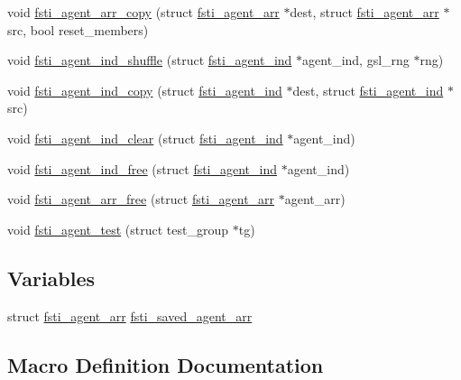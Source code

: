 \begin{DoxyCompactItemize}
\item 
void \mbox{\hyperlink{fsti-agent_8h_ae9ffb7f208aa2ca7f0e5a1999ae69425}{fsti\+\_\+agent\+\_\+arr\+\_\+copy}} (struct \mbox{\hyperlink{structfsti__agent__arr}{fsti\+\_\+agent\+\_\+arr}} $\ast$dest, struct \mbox{\hyperlink{structfsti__agent__arr}{fsti\+\_\+agent\+\_\+arr}} $\ast$src, bool reset\+\_\+members)
\item 
void \mbox{\hyperlink{fsti-agent_8h_ae598f299bc63165f2f0b5c9d5c72e52c}{fsti\+\_\+agent\+\_\+ind\+\_\+shuffle}} (struct \mbox{\hyperlink{structfsti__agent__ind}{fsti\+\_\+agent\+\_\+ind}} $\ast$agent\+\_\+ind, gsl\+\_\+rng $\ast$rng)
\item 
void \mbox{\hyperlink{fsti-agent_8h_a6681f5dfe9ce93defe0d395774010080}{fsti\+\_\+agent\+\_\+ind\+\_\+copy}} (struct \mbox{\hyperlink{structfsti__agent__ind}{fsti\+\_\+agent\+\_\+ind}} $\ast$dest, struct \mbox{\hyperlink{structfsti__agent__ind}{fsti\+\_\+agent\+\_\+ind}} $\ast$src)
\item 
void \mbox{\hyperlink{fsti-agent_8h_a6ea0014798a460e51b30b2d8af0dda25}{fsti\+\_\+agent\+\_\+ind\+\_\+clear}} (struct \mbox{\hyperlink{structfsti__agent__ind}{fsti\+\_\+agent\+\_\+ind}} $\ast$agent\+\_\+ind)
\item 
void \mbox{\hyperlink{fsti-agent_8h_ab9adb18f274475832c5a763be7d001d7}{fsti\+\_\+agent\+\_\+ind\+\_\+free}} (struct \mbox{\hyperlink{structfsti__agent__ind}{fsti\+\_\+agent\+\_\+ind}} $\ast$agent\+\_\+ind)
\item 
void \mbox{\hyperlink{fsti-agent_8h_a0c1f310e7cd98b4122a4348b0ec26b4f}{fsti\+\_\+agent\+\_\+arr\+\_\+free}} (struct \mbox{\hyperlink{structfsti__agent__arr}{fsti\+\_\+agent\+\_\+arr}} $\ast$agent\+\_\+arr)
\item 
void \mbox{\hyperlink{fsti-agent_8h_aa9fa3865ab9658915f20e4212ca4cbe4}{fsti\+\_\+agent\+\_\+test}} (struct test\+\_\+group $\ast$tg)
\end{DoxyCompactItemize}
\subsection*{Variables}
\begin{DoxyCompactItemize}
\item 
struct \mbox{\hyperlink{structfsti__agent__arr}{fsti\+\_\+agent\+\_\+arr}} \mbox{\hyperlink{fsti-agent_8h_a0d0890f5771bd3efa056881d37f4c6b9}{fsti\+\_\+saved\+\_\+agent\+\_\+arr}}
\end{DoxyCompactItemize}


\subsection{Macro Definition Documentation}
\mbox{\label{fsti-agent_8h_a4c03aa904df401cdd442c95af046e217}} 
